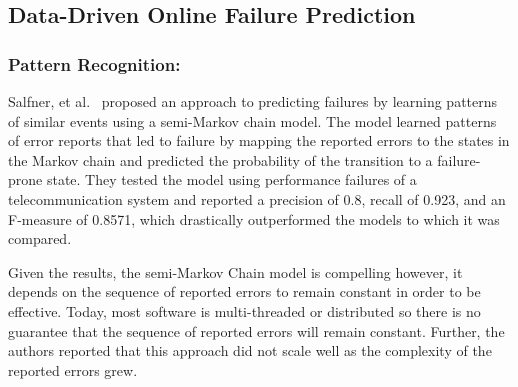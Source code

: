 \figpatternRecognition

\subsection{Data-Driven Online Failure Prediction}

\subsubsection{Pattern Recognition:}
Salfner, et al.~\cite{salfner2006} proposed an approach to predicting failures
by learning patterns of similar events using a semi-Markov chain model.
The model learned patterns of error reports that led to failure by mapping the
reported errors to the states in the Markov chain and predicted the probability
of the transition to a failure-prone state.  They tested the model using
performance failures of a telecommunication system and reported a precision of
0.8, recall of 0.923, and an F-measure of 0.8571, which drastically
outperformed the models to which it was compared.

Given the results, the semi-Markov Chain model is compelling however, it
depends on the sequence of reported errors to remain constant in order to be
effective.  Today, most software is multi-threaded or distributed so there is
no guarantee that the sequence of reported errors will remain constant.
Further, the authors reported that this approach did not scale well as the
complexity of the reported errors grew.

